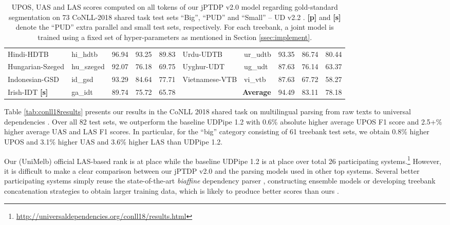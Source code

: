 \documentclass[11pt,letterpaper]{article}
\begin{document}
\begin{table*}[!ht]
{\begin{tabular}{l|l|ccc||l|l|ccc}
Hindi-HDTB & hi\_hdtb & 96.94 & 93.25 & 89.83 & Urdu-UDTB & ur\_udtb & 93.35 & 86.74 & 80.44 \\
Hungarian-Szeged & hu\_szeged & 92.07 & 76.18 & 69.75 & Uyghur-UDT & ug\_udt & 87.63 & 76.14 & 63.37 \\
Indonesian-GSD & id\_gsd & 93.29 & 84.64 & 77.71 & Vietnamese-VTB & vi\_vtb & 87.63 & 67.72 & 58.27 \\
\cline{6-10}
Irish-IDT \textbf{[s]} & ga\_idt & 89.74 & 75.72 & 65.78 &\multicolumn{2}{r|}{\textbf{Average}}& 94.49 &  83.11 &  78.18\\
\hline
\end{tabular}
}
\caption{UPOS, UAS and LAS scores computed on all tokens of our jPTDP v2.0 model
regarding gold-standard segmentation on 73 CoNLL-2018 shared task test sets ``Big'', ``PUD'' and ``Small'' -- UD v2.2 \citep{11234/1-2837}.  \textbf{[p]} and \textbf{[s]} denote the ``PUD'' extra parallel and small test sets, respectively. For each treebank, a joint model is trained using a fixed set of hyper-parameters as mentioned in Section \ref{ssec:implement}.}
\label{tab:Scoreswithgoldseg}
\end{table*}


Table \ref{tab:conll18results}  presents our   results
in the CoNLL 2018 shared task on multilingual parsing from raw texts to universal dependencies \citep{udst:overview}.  Over all 82 test sets, we outperform the baseline UDPipe 1.2 with 0.6\% absolute higher average UPOS F1 score and 2.5+\%  higher average UAS and LAS F1 scores. In particular, for the ``big'' category consisting of 61 treebank test sets, we obtain 0.8\% higher UPOS  and 3.1\% higher UAS and 3.6\% higher LAS  than UDPipe 1.2. 


Our (UniMelb) official LAS-based rank is at  place while the baseline  UDPipe 1.2 is at   place over total 26 participating systems.\footnote{\url{http://universaldependencies.org/conll18/results.html}} However, 
 it is difficult  to make a clear comparison between our jPTDP v2.0  and the parsing models used in other top  systems. 
 Several better participating systems simply reuse the state-of-the-art \textit{biaffine} dependency parser  \citep{DozatM17,dozat-qi-manning:2017:K17-3},  constructing
ensemble models or developing  treebank concatenation strategies to obtain larger training data, which is likely to produce better scores than ours  \citep{udst:overview}. 
 
\end{document}
